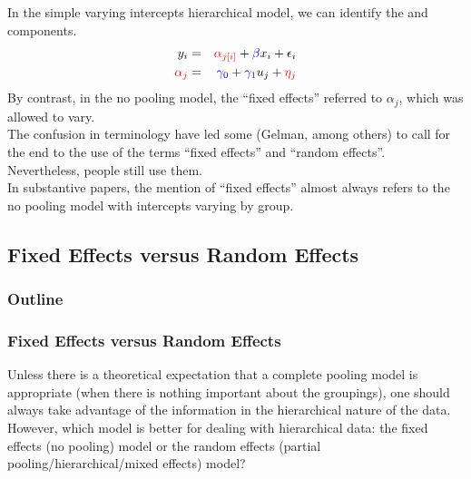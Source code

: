 \documentclass[handout]{beamer}
\begin{document}
\begin{frame}
In the simple varying intercepts hierarchical model, we can identify
the  and  components.
\pause
\begin{eqnarray*}
y_i &=& \textcolor{red}{\alpha_{j[i]}} + \textcolor{blue}{\beta} x_i + \epsilon_i \\
\textcolor{red}{\alpha_j} &=& \textcolor{blue}{\gamma_0} + \textcolor{blue}{\gamma_1} u_j + \textcolor{red}{\eta_j}
\end{eqnarray*}
\pause
By contrast, in the no pooling model, the ``fixed effects'' referred
to $\alpha_j$, which was allowed to vary.\\
\bigskip
\pause
The confusion in terminology have led some (Gelman, among others) to
call for the end to the use of the terms ``fixed effects'' and ``random
effects''.\\
\bigskip
\pause
Nevertheless, people still use them.\\
\bigskip
\pause
In substantive papers, the mention of ``fixed effects'' almost always refers to the no
pooling model with intercepts varying by group.
\end{frame}

\subsection{Fixed Effects versus Random Effects}

\begin{frame}
\frametitle{Outline}
\tableofcontents[currentsubsection]
\end{frame}

\begin{frame}
\frametitle{Fixed Effects versus Random Effects}
\pause
Unless there is a theoretical expectation that a complete pooling
model is appropriate (when there is nothing important about the
groupings), one should always take advantage of the information in the
hierarchical nature of the data.\\
\pause
\bigskip
However, which model is better for dealing with hierarchical data: the
fixed effects (no pooling) model or the random effects
(partial pooling/hierarchical/mixed effects) model?
\end{frame}
\end{document}

